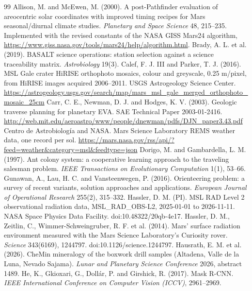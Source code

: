 \documentclass[11pt,a4paper]{article}
\begin{document}
\begin{thebibliography}{99}
 Allison, M. and McEwen, M. (2000). A post-Pathfinder evaluation of areocentric solar coordinates with improved timing recipes for Mars seasonal/diurnal climate studies. \emph{Planetary and Space Science} 48, 215--235. Implemented with the revised constants of the NASA GISS Mars24 algorithm, \url{https://www.giss.nasa.gov/tools/mars24/help/algorithm.html}.
 Brady, A. L. et al. (2019). BASALT science operations: station selection against a science traceability matrix. \emph{Astrobiology} 19(3).
 Calef, F. J. III and Parker, T. J. (2016). MSL Gale crater HiRISE orthophoto mosaics, colour and greyscale, 0.25 m/pixel, from HiRISE images acquired 2006--2011. USGS Astrogeology Science Center. \url{https://astrogeology.usgs.gov/search/map/mars_msl_gale_merged_orthophoto_mosaic_25cm}
 Carr, C. E., Newman, D. J. and Hodges, K. V. (2003). Geologic traverse planning for planetary EVA. SAE Technical Paper 2003-01-2416. \url{http://web.mit.edu/aeroastro/www/people/dnewman/pdfs/DJN_paper3.43.pdf}
 Centro de Astrobiología and NASA. Mars Science Laboratory REMS weather data, one record per sol. \url{https://mars.nasa.gov/rss/api/?feed=weather&category=msl&feedtype=json}
 Dorigo, M. and Gambardella, L. M. (1997). Ant colony system: a cooperative learning approach to the traveling salesman problem. \emph{IEEE Transactions on Evolutionary Computation} 1(1), 53--66.
 Gunawan, A., Lau, H. C. and Vansteenwegen, P. (2016). Orienteering problem: a survey of recent variants, solution approaches and applications. \emph{European Journal of Operational Research} 255(2), 315--332.
 Hassler, D. M. (PI). MSL RAD Level 2 observational radiation data, MSL\_RAD\_OBS-L2, 2025-01-01 to 2026-11-11. NASA Space Physics Data Facility. doi:10.48322/20qb-4e17.
 Hassler, D. M., Zeitlin, C., Wimmer-Schweingruber, R. F. et al. (2014). Mars' surface radiation environment measured with the Mars Science Laboratory's Curiosity rover. \emph{Science} 343(6169), 1244797. doi:10.1126/science.1244797.
 Hausrath, E. M. et al. (2026). CheMin mineralogy of the boxwork drill samples (Altadena, Valle de la Luna, Nevado Sajama). \emph{Lunar and Planetary Science Conference} 2026, abstract 1489.
 He, K., Gkioxari, G., Dollár, P. and Girshick, R. (2017). Mask R-CNN. \emph{IEEE International Conference on Computer Vision (ICCV)}, 2961--2969.

\end{thebibliography}
\end{document}
